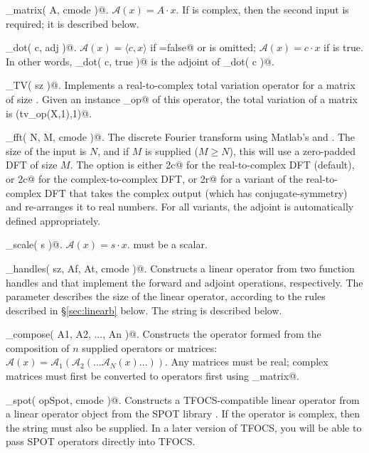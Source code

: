 \documentclass{article}
\newcommand{\cA}{\ensuremath{\mathcal{A}}}    %
\newcommand{\<}{\langle}
\renewcommand{\>}{\rangle}
\begin{document}
\begin{trivlist}
\item \verb@linop_matrix( A, cmode )@. $\cA(x) = A \cdot x$.
If \verb@A@ is complex, then the second input \verb@cmode@ is required; 
it is described below.
\item \verb@linop_dot( c, adj )@. $\cA(x) = \<c,x\>$ if \verb@adj=false@
or \verb@adj@ is omitted; $\cA(x) = c \cdot x$ if \verb@adj@ is true. In
other words, \verb@linop_dot( c, true )@ is the adjoint of \verb@linop_dot( c )@.
\item \verb@linop_TV( sz )@. Implements a real-to-complex total variation
operator for a matrix of size \verb@sz@. Given an instance \verb@tv_op@ of
this operator, the total variation of a matrix \verb@X@ is \verb@norm(tv_op(X,1),1)@.
\item \verb@linop_fft( N, M, cmode )@. The discrete Fourier transform using Matlab's \verb@fft@ and \verb@ifft@. The size of the input is $N$, and if $M$ is supplied ($M \ge N$), this will use a zero-padded DFT of size $M$. The \verb@cmode@ option is either \verb@r2c@ for the real-to-complex DFT (default), or \verb@c2c@ for the complex-to-complex DFT, or \verb@r2r@ for a variant of the real-to-complex DFT that takes the complex output (which has conjugate-symmetry) and re-arranges it to real numbers. For all variants, the adjoint is automatically defined appropriately.
\item \verb@linop_scale( s )@. $\cA(x) = s \cdot x$. \verb@s@ must be a scalar.
\item \verb@linop_handles( sz, Af, At, cmode )@. Constructs a linear operator
from two function handles \verb@Af@ and \verb@At@ that implement the
forward and adjoint operations, respectively. The \verb@sz@ parameter
describes the size of the linear operator, according to the rules
described in \S\ref{sec:linearb} below. The \verb@cmode@ string is
described below.
\item \verb@linop_compose( A1, A2, ..., An )@. Constructs the operator formed from
the composition of $n$ supplied operators or matrices: $\cA(x)=\cA_1(\cA_2(...\cA_N(x)...))$.
Any matrices must be real; complex matrices must first be converted to operators
first using \verb@linop_matrix@.
\item \verb@linop_spot( opSpot, cmode )@. Constructs a TFOCS-compatible linear
operator from a linear operator object from the SPOT library \cite{SPOT}.
If the operator is complex, then the \verb@cmode@
string must also be supplied. In a later version of TFOCS, you will be
able to pass SPOT operators directly into TFOCS.

\end{trivlist}
\end{document}
